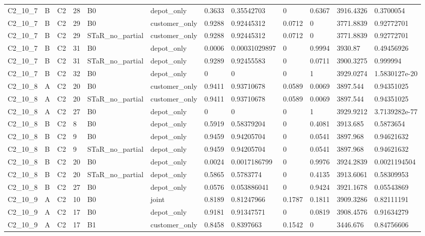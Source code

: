 \begin{longtable}{llllllllllll}
C2\_10\_7 & B & C2 & 28 & B0 & depot\_only & 0.3633 & 0.35542703 & 0 & 0.6367 & 3916.4326 & 0.3700054 \\
C2\_10\_7 & B & C2 & 29 & B0 & customer\_only & 0.9288 & 0.92445312 & 0.0712 & 0 & 3771.8839 & 0.92772701 \\
C2\_10\_7 & B & C2 & 29 & STaR\_no\_partial & customer\_only & 0.9288 & 0.92445312 & 0.0712 & 0 & 3771.8839 & 0.92772701 \\
C2\_10\_7 & B & C2 & 31 & B0 & depot\_only & 0.0006 & 0.00031029897 & 0 & 0.9994 & 3930.87 & 0.49456926 \\
C2\_10\_7 & B & C2 & 31 & STaR\_no\_partial & depot\_only & 0.9289 & 0.92455583 & 0 & 0.0711 & 3900.3275 & 0.999994 \\
C2\_10\_7 & B & C2 & 32 & B0 & depot\_only & 0 & 0 & 0 & 1 & 3929.0274 & 1.5830127e-20 \\
C2\_10\_8 & A & C2 & 20 & B0 & customer\_only & 0.9411 & 0.93710678 & 0.0589 & 0.0069 & 3897.544 & 0.94351025 \\
C2\_10\_8 & A & C2 & 20 & STaR\_no\_partial & customer\_only & 0.9411 & 0.93710678 & 0.0589 & 0.0069 & 3897.544 & 0.94351025 \\
C2\_10\_8 & A & C2 & 27 & B0 & depot\_only & 0 & 0 & 0 & 1 & 3929.9212 & 3.7139282e-77 \\
C2\_10\_8 & B & C2 & 8 & B0 & depot\_only & 0.5919 & 0.58379204 & 0 & 0.4081 & 3913.685 & 0.5873654 \\
C2\_10\_8 & B & C2 & 9 & B0 & depot\_only & 0.9459 & 0.94205704 & 0 & 0.0541 & 3897.968 & 0.94621632 \\
C2\_10\_8 & B & C2 & 9 & STaR\_no\_partial & depot\_only & 0.9459 & 0.94205704 & 0 & 0.0541 & 3897.968 & 0.94621632 \\
C2\_10\_8 & B & C2 & 20 & B0 & depot\_only & 0.0024 & 0.0017186799 & 0 & 0.9976 & 3924.2839 & 0.0021194504 \\
C2\_10\_8 & B & C2 & 20 & STaR\_no\_partial & depot\_only & 0.5865 & 0.5783774 & 0 & 0.4135 & 3913.6061 & 0.58309953 \\
C2\_10\_8 & B & C2 & 27 & B0 & depot\_only & 0.0576 & 0.053886041 & 0 & 0.9424 & 3921.1678 & 0.05543869 \\
C2\_10\_9 & A & C2 & 10 & B0 & joint & 0.8189 & 0.81247966 & 0.1787 & 0.1811 & 3909.3286 & 0.82111191 \\
C2\_10\_9 & A & C2 & 17 & B0 & depot\_only & 0.9181 & 0.91347571 & 0 & 0.0819 & 3908.4576 & 0.91634279 \\
C2\_10\_9 & A & C2 & 17 & B1 & customer\_only & 0.8458 & 0.8397663 & 0.1542 & 0 & 3446.676 & 0.84756606 \\

\end{longtable}

